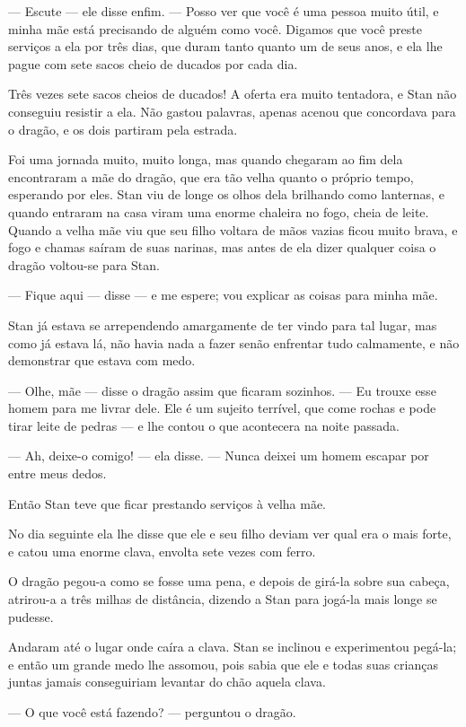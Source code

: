 — Escute — ele disse enfim. — Posso ver que você é uma pessoa muito
útil, e minha mãe está precisando de alguém como você. Digamos que
você preste serviços a ela por três dias, que duram tanto quanto um
de seus anos, e ela lhe pague com sete sacos cheio de ducados por
cada dia.

Três vezes sete sacos cheios de ducados! A oferta era muito tentadora,
e Stan não conseguiu resistir a ela. Não gastou palavras, apenas
acenou que concordava para o dragão, e os dois partiram pela estrada.

Foi uma jornada muito, muito longa, mas quando chegaram ao fim dela
encontraram a mãe do dragão, que era tão velha quanto o próprio
tempo, esperando por eles. Stan viu de longe os olhos dela brilhando
como lanternas, e quando entraram na casa viram uma enorme chaleira
no fogo, cheia de leite. Quando a velha mãe viu que seu filho voltara
de mãos vazias ficou muito brava, e fogo e chamas saíram de suas
narinas, mas antes de ela dizer qualquer coisa o dragão voltou-se
para Stan.

— Fique aqui — disse — e me espere; vou explicar as coisas para minha
mãe.

Stan já estava se arrependendo amargamente de ter vindo para tal
lugar, mas como já estava lá, não havia nada a fazer senão enfrentar
tudo calmamente, e não demonstrar que estava com medo.

— Olhe, mãe — disse o dragão assim que ficaram sozinhos. — Eu trouxe
esse homem para me livrar dele. Ele é um sujeito terrível, que come
rochas e pode tirar leite de pedras — e lhe contou o que acontecera
na noite passada.

— Ah, deixe-o comigo! — ela disse. — Nunca deixei um homem escapar por
entre meus dedos.

Então Stan teve que ficar prestando serviços à velha mãe.

No dia seguinte ela lhe disse que ele e seu filho deviam ver qual era
o mais forte, e catou uma enorme clava, envolta sete vezes com ferro.

O dragão pegou-a como se fosse uma pena, e depois de girá-la sobre sua
cabeça, atrirou-a a três milhas de distância, dizendo a Stan para
jogá-la mais longe se pudesse.

Andaram até o lugar onde caíra a clava. Stan se inclinou e
experimentou pegá-la; e então um grande medo lhe assomou, pois sabia
que ele e todas suas crianças juntas jamais conseguiriam levantar do
chão aquela clava. 

— O que você está fazendo? — perguntou o dragão.

